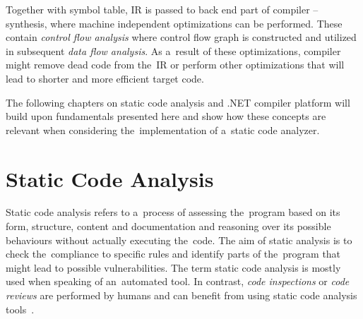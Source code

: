 \documentclass[
  digital, %
  table,   %
  lof,     %
  lot,     %
  oneside,
]{fithesis3}
\begin{document}
\bigskip
Together with symbol table, IR is passed to back end part of compiler -- synthesis, where machine independent optimizations can be performed. These contain \textit{control flow analysis} where control flow graph is constructed and utilized in subsequent \textit{data flow analysis}. As a~result of these optimizations, compiler might remove dead code from the~IR or perform other optimizations that will lead to shorter and more efficient target code.

\bigskip
The following chapters on static code analysis and .NET compiler platform will build upon fundamentals presented here and show how these concepts are relevant when considering the~implementation of a~static code analyzer.

  \newpage
\chapter{Static Code Analysis}
\label{chap:static-code-analysis}
Static code analysis refers to a~process of assessing the~program based on its form, structure, content and documentation and reasoning over its possible behaviours without actually executing the~code. The aim of static analysis is to check the~compliance to specific rules and identify parts of the~program that might lead to possible vulnerabilities. The term static code analysis is mostly used when speaking of an~automated tool. In contrast, \textit{code inspections} or \textit{code reviews} are performed by humans and can benefit from using static code analysis tools~\cite{oswap-sca, ppt-sca}.
\end{document}
